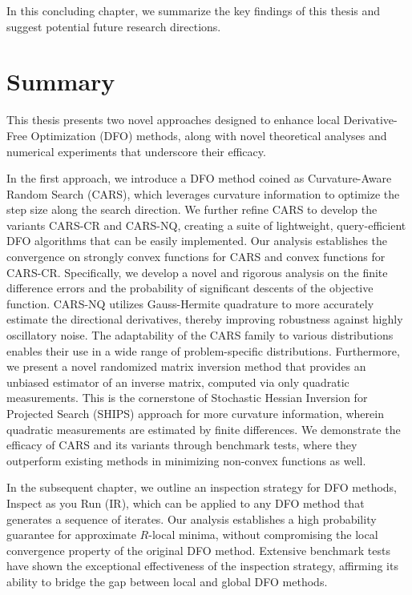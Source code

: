 In this concluding chapter, we summarize the key findings of this thesis and suggest potential future research directions.

\section{Summary}
This thesis presents two novel approaches designed to enhance local Derivative-Free Optimization (DFO) methods, along with novel theoretical analyses and numerical experiments that underscore their efficacy.

In the first approach, we introduce a DFO method coined as Curvature-Aware Random Search (CARS), which leverages curvature information to optimize the step size along the search direction. We further refine CARS to develop the variants CARS-CR and CARS-NQ, creating a suite of lightweight, query-efficient DFO algorithms that can be easily implemented. 
Our analysis establishes the convergence on strongly convex functions for CARS and convex functions for CARS-CR. Specifically, we develop a novel and rigorous analysis on the finite difference errors and the probability of significant descents of the objective function. 
CARS-NQ utilizes Gauss-Hermite quadrature to more accurately estimate the directional derivatives, thereby improving robustness against highly oscillatory noise. 
The adaptability of the CARS family to various distributions enables their use in a wide range of problem-specific distributions. 
Furthermore, we present a novel randomized matrix inversion method that provides an unbiased estimator of an inverse matrix, computed via only quadratic measurements.
This is the cornerstone of Stochastic Hessian Inversion for Projected Search (SHIPS) approach for more curvature information, wherein quadratic measurements are estimated by finite differences.
 We demonstrate the efficacy of CARS and its variants through benchmark tests, where they outperform existing methods in minimizing non-convex functions as well.

In the subsequent chapter, we outline an inspection strategy for DFO methods, Inspect as you Run (IR), which can be applied to any DFO method that generates a sequence of iterates. Our analysis establishes a high probability guarantee for approximate $R$-local minima, without compromising the local convergence property of the original DFO method. Extensive benchmark tests have shown the exceptional effectiveness of the inspection strategy, affirming its ability to bridge the gap between local and global DFO methods.

